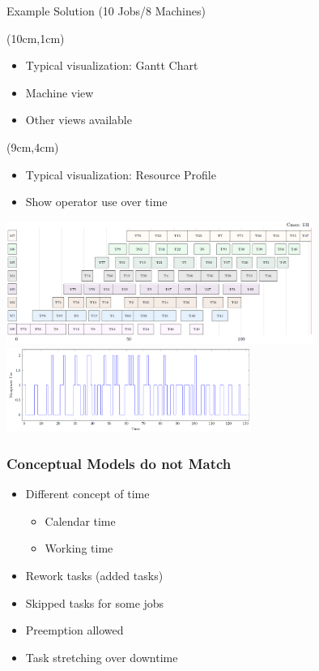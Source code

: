 \begin{frame}[label=runningsolution]{Example Solution (10 Jobs/8 Machines)}
\begin{textblock*}{5cm}(10cm,1cm)
\begin{itemize}
    \item Typical visualization: Gantt Chart
    \item Machine view
    \item Other views available
\end{itemize}
\end{textblock*}
\begin{textblock*}{6cm}(9cm,4cm)
\begin{itemize}
    \item Typical visualization: Resource Profile
    \item Show operator use over time
\end{itemize}
\end{textblock*}
\includegraphics[width=10cm]{images/flowsolutionlimit2}    
\includegraphics[width=8cm]{images/flowoperatorlimit2.PNG}    
\end{frame}



\begin{frame}
  \frametitle{Conceptual Models do not Match}
  \begin{itemize}
  \item Different concept of time
    \begin{itemize}
        \item Calendar time
        \item Working time
    \end{itemize}
  \item Rework tasks (added tasks)
    \item Skipped tasks for some jobs
  \item Preemption allowed
    \item Task stretching over downtime
  \end{itemize}
\end{frame}

